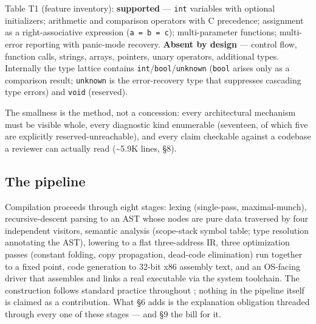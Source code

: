 Table T1 (feature inventory): \textbf{supported} --- \texttt{int} variables with
optional initializers; arithmetic and comparison operators with C
precedence; assignment as a right-associative expression
(\texttt{a = b = c}); multi-parameter functions; multi-error reporting with
panic-mode recovery. \textbf{Absent by design} --- control flow, function
calls, strings, arrays, pointers, unary operators, additional types.
Internally the type lattice contains \texttt{int}/\texttt{bool}/\texttt{unknown} (\texttt{bool}
arises only as a comparison result; \texttt{unknown} is the error-recovery
type that suppresses cascading type errors) and \texttt{void} (reserved).

The smallness is the method, not a concession: every architectural
mechanism must be visible whole, every diagnostic kind enumerable
(seventeen, of which five are explicitly reserved-unreachable), and
every claim checkable against a codebase a reviewer can actually
read (\textasciitilde{}5.9K lines, \S8).

\subsection{The pipeline}

Compilation proceeds through eight stages: lexing (single-pass,
maximal-munch), recursive-descent parsing to an AST whose nodes are
pure data traversed by four independent visitors, semantic analysis
(scope-stack symbol table; type resolution annotating the AST),
lowering to a flat three-address IR, three optimization passes
(constant folding, copy propagation, dead-code elimination) run
together to a fixed point, code generation to 32-bit x86 assembly
text, and an OS-facing driver that assembles and links a real
executable via the system toolchain. The construction follows
standard practice throughout \cite{aho2006compilers}; nothing in the
pipeline itself is claimed as a contribution. What \S6 adds is the
explanation obligation threaded through every one of these stages ---
and \S9 the bill for it.



